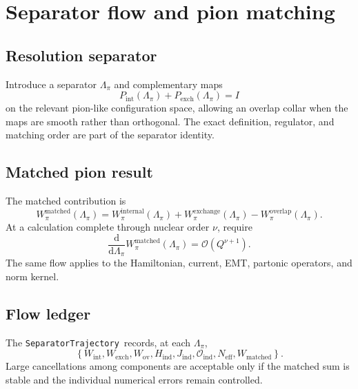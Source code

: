 \documentclass[11pt]{article}
\newcommand{\dd}{\mathrm{d}}
\newcommand{\cO}{\mathcal O}
\newcommand{\eff}{\mathrm{eff}}
\newcommand{\ind}{\mathrm{ind}}
\newcommand{\SeparatorTrajectory}{\texttt{Separator\allowbreak Trajectory}}
\begin{document}
\section{Separator flow and pion matching}
\label{sec:separator}

\subsection{Resolution separator}

Introduce a separator \(\Lambda_\pi\) and complementary maps
\begin{equation}
 P_{\mathrm{int}}(\Lambda_\pi)
 +P_{\mathrm{exch}}(\Lambda_\pi)
 =I
 \label{eq:separator-partition}
\end{equation}
on the relevant pion-like configuration space, allowing an overlap collar
when the maps are smooth rather than orthogonal.  The exact definition,
regulator, and matching order are part of the separator identity.

\subsection{Matched pion result}

The matched contribution is
\begin{equation}
 W_{\pi}^{\mathrm{matched}}(\Lambda_\pi)
 =
 W_{\pi}^{\mathrm{internal}}(\Lambda_\pi)
 +W_{\pi}^{\mathrm{exchange}}(\Lambda_\pi)
 -W_{\pi}^{\mathrm{overlap}}(\Lambda_\pi).
 \label{eq:matched-pion}
\end{equation}
At a calculation complete through nuclear order \(\nu\), require
\begin{equation}
 \frac{\dd}{\dd\Lambda_\pi}
 W_{\pi}^{\mathrm{matched}}(\Lambda_\pi)
 =\cO(Q^{\nu+1}).
 \label{eq:separator-invariance}
\end{equation}
The same flow applies to the Hamiltonian, current, EMT, partonic operators, and
norm kernel.

\subsection{Flow ledger}

The \SeparatorTrajectory\ records, at each \(\Lambda_\pi\),
\begin{equation}
 \left\{
 W_{\mathrm{int}},
 W_{\mathrm{exch}},
 W_{\mathrm{ov}},
 H_{\ind},
 J_{\ind},
 \cO_{\ind},
 N_{\eff},
 W_{\mathrm{matched}}
 \right\}.
 \label{eq:separator-ledger}
\end{equation}
Large cancellations among components are acceptable only if the matched sum
is stable and the individual numerical errors remain controlled.
\end{document}
